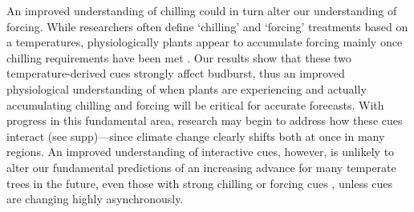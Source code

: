 \documentclass{article}
\begin{document}

\par An improved understanding of chilling could in turn alter our understanding of forcing. While researchers often define `chilling' and `forcing' treatments based on a temperatures, physiologically plants appear to accumulate forcing mainly once chilling requirements have been met \citep{chuin2016}. Our results show that these two temperature-derived cues strongly affect budburst, thus an improved physiological understanding of when plants are experiencing and actually accumulating chilling and forcing will be critical for accurate forecasts. With progress in this fundamental area, research may begin to address how these cues interact (see supp)---since climate change clearly shifts both at once in many regions. An improved understanding of interactive cues, however, is unlikely to alter our fundamental predictions of an increasing advance for many temperate trees in the future, even those with strong chilling or forcing cues \citep{gauzere2017}, unless cues are changing highly asynchronously. 


\end{document}

